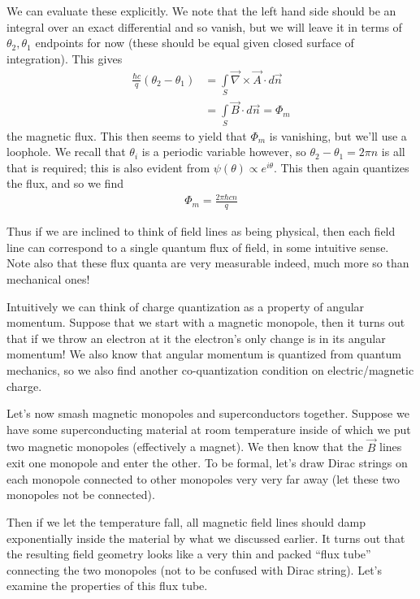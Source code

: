 \documentclass[10pt]{report}
\begin{document}
We can evaluate these explicitly. We note that the left hand side should be an integral over an exact differential and so vanish, but we will leave it in terms of $\theta_2, \theta_1$ endpoints for now (these should be equal given closed surface of integration). This gives
\begin{align}
    \frac{\hbar c}{q}(\theta_2 - \theta_1) &= \int\limits_{S}^{}\vec{\nabla} \times \vec{A}\cdot d\vec{n}\\
    &= \int\limits_{S}^{}\vec{B}\cdot d\vec{n} = \Phi_m
\end{align}
the magnetic flux. This then seems to yield that $\Phi_m$ is vanishing, but we'll use a loophole. We recall that $\theta_i$ is a periodic variable however, so $\theta_2 - \theta_1 = 2\pi n$ is all that is required; this is also evident from $\psi(\theta) \propto e^{i\theta}$. This then again quantizes the flux, and so we find
\begin{align}
    \Phi_m = \frac{2\pi \hbar c n}{q}
\end{align}

Thus if we are inclined to think of field lines as being physical, then each field line can correspond to a single quantum flux of field, in some intuitive sense. Note also that these flux quanta are very measurable indeed, much more so than mechanical ones!

Intuitively we can think of charge quantization as a property of angular momentum. Suppose that we start with a magnetic monopole, then it turns out that if we throw an electron at it the electron's only change is in its angular momentum! We also know that angular momentum is quantized from quantum mechanics, so we also find another co-quantization condition on electric/magnetic charge.

Let's now smash magnetic monopoles and superconductors together. Suppose we have some superconducting material at room temperature inside of which we put two magnetic monopoles (effectively a magnet). We then know that the $\vec{B}$ lines exit one monopole and enter the other. To be formal, let's draw Dirac strings on each monopole connected to other monopoles very very far away (let these two monopoles not be connected). 

Then if we let the temperature fall, all magnetic field lines should damp exponentially inside the material by what we discussed earlier. It turns out that the resulting field geometry looks like a very thin and packed ``flux tube'' connecting the two monopoles (not to be confused with Dirac string). Let's examine the properties of this flux tube. 
\end{document}
